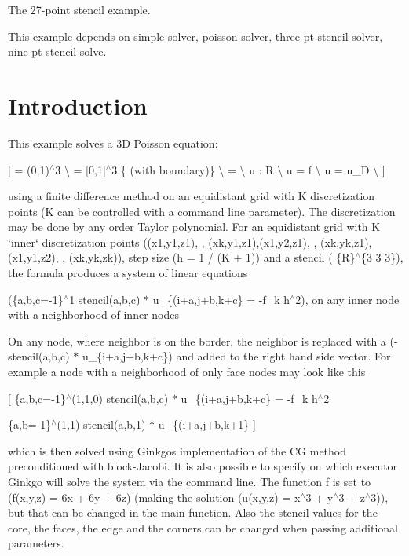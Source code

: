 The 27-\/point stencil example.

This example depends on simple-\/solver, poisson-\/solver, three-\/pt-\/stencil-\/solver, nine-\/pt-\/stencil-\/solve.

 \label{_Intro}%
 \label{_Introduction}%
\section*{Introduction}

This example solves a 3D Poisson equation\+:

\mbox{[}  = (0,1)$^\wedge$3 \textbackslash{}  = \mbox{[}0,1\mbox{]}$^\wedge$3 \{ (with boundary)\} \textbackslash{}  =    \textbackslash{} u \+:   R \textbackslash{} u\textquotesingle{}\textquotesingle{} = f   \textbackslash{} u = u\+\_\+D   \textbackslash{} \mbox{]}

using a finite difference method on an equidistant grid with {\ttfamily K} discretization points ({\ttfamily K} can be controlled with a command line parameter). The discretization may be done by any order Taylor polynomial. For an equidistant grid with K \char`\"{}inner\char`\"{} discretization points ((x1,y1,z1), , (xk,y1,z1),(x1,y2,z1), , (xk,yk,z1), (x1,y1,z2), , (xk,yk,zk)), step size (h = 1 / (K + 1)) and a stencil ( \{R\}$^\wedge$\{3  3  3\}), the formula produces a system of linear equations

(\{a,b,c=-\/1\}$^\wedge$1 stencil(a,b,c) $\ast$ u\+\_\+\{(i+a,j+b,k+c\} = -\/f\+\_\+k h$^\wedge$2), on any inner node with a neighborhood of inner nodes

On any node, where neighbor is on the border, the neighbor is replaced with a (-\/stencil(a,b,c) $\ast$ u\+\_\+\{i+a,j+b,k+c\}) and added to the right hand side vector. For example a node with a neighborhood of only face nodes may look like this

\mbox{[} \{a,b,c=-\/1\}$^\wedge$(1,1,0) stencil(a,b,c) $\ast$ u\+\_\+\{(i+a,j+b,k+c\} = -\/f\+\_\+k h$^\wedge$2
\begin{DoxyItemize}
\item \{a,b=-\/1\}$^\wedge$(1,1) stencil(a,b,1) $\ast$ u\+\_\+\{(i+a,j+b,k+1\} \mbox{]}
\end{DoxyItemize}

which is then solved using Ginkgo\textquotesingle{}s implementation of the CG method preconditioned with block-\/\+Jacobi. It is also possible to specify on which executor Ginkgo will solve the system via the command line. The function {\ttfamily f} is set to (f(x,y,z) = 6x + 6y + 6z) (making the solution (u(x,y,z) = x$^\wedge$3 + y$^\wedge$3 + z$^\wedge$3)), but that can be changed in the {\ttfamily main} function. Also the stencil values for the core, the faces, the edge and the corners can be changed when passing additional parameters.

